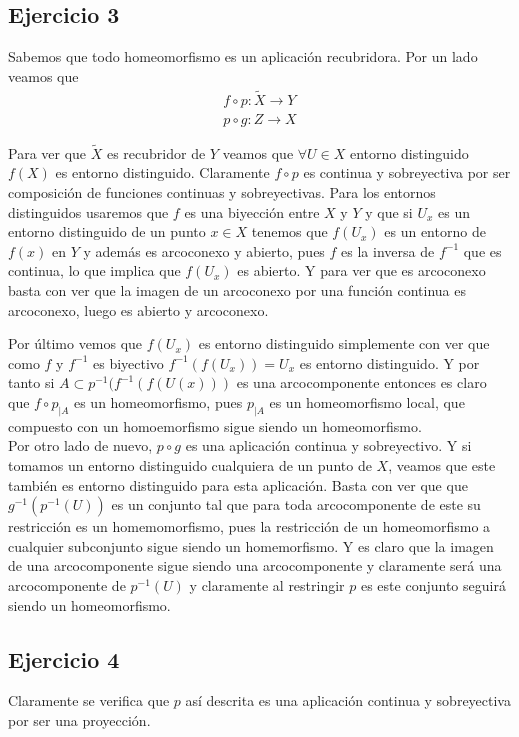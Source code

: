 \documentclass{article}
\begin{document}
\subsection{Ejercicio 3}
Sabemos que todo homeomorfismo es un aplicación recubridora. Por un lado veamos que
\begin{gather*}
f\circ p: \tilde{X}\rightarrow Y\\
p\circ g:Z\rightarrow X
\end{gather*}

Para ver que $\tilde{X}$ es recubridor de $Y$ veamos que $\forall U\in X$ entorno distinguido $f(X)$ es entorno distinguido. Claramente $f\circ p$ es continua y sobreyectiva por ser composición de funciones continuas y sobreyectivas. Para los entornos distinguidos usaremos que $f$ es una biyección entre $X$ y $Y$ y que si $U_x$ es un entorno distinguido de un punto $x\in X$ tenemos que $f(U_x)$ es un entorno de $f(x)$ en $Y$ y además es arcoconexo y abierto, pues $f$ es la inversa de $f^{-1}$ que es continua, lo que implica que $f(U_x)$ es abierto. Y para ver que es arcoconexo basta con ver que la imagen de un arcoconexo por una función continua es arcoconexo, luego es abierto y arcoconexo. 

Por último vemos que $f(U_x)$ es entorno distinguido simplemente con ver que como $f$ y $f^{-1}$ es biyectivo $f^{-1}(f(U_x))=U_x$ es entorno distinguido. Y por tanto si $A\subset p^{-1}(f^{-1}(f(U(x)))$ es una arcocomponente entonces es claro que $f\circ p_{|A}$ es un homeomorfismo, pues $p_{|A}$ es un homeomorfismo local, que compuesto con un homoemorfismo sigue siendo un homeomorfismo.\\

Por otro lado de nuevo, $p\circ g$ es una aplicación continua y sobreyectivo. Y si tomamos un entorno distinguido cualquiera de un punto de $X$, veamos que este también es entorno distinguido para esta aplicación. Basta con ver que que $g^{-1}(p^{-1}(U))$ es un conjunto tal que para toda arcocomponente de este su restricción es un homemomorfismo, pues la restricción de un homeomorfismo a cualquier subconjunto sigue siendo un homemorfismo. Y es claro que la imagen de una arcocomponente sigue siendo una arcocomponente y claramente será una arcocomponente de $p^{-1}(U)$ y claramente al restringir $p$ es este conjunto seguirá siendo un homeomorfismo.

\subsection{Ejercicio 4}
Claramente se verifica que $p$ así descrita es una aplicación continua y sobreyectiva por ser una proyección.
\end{document}
